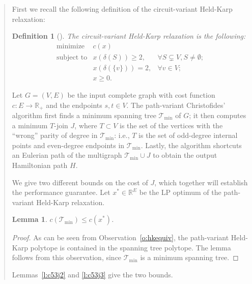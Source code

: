 \documentclass[11pt,letterpaper]{article}
\newtheorem{lemma}{Lemma}
\newtheorem{defn}{Definition}
\begin{document}
\begin{quote}
First we recall the following definition of the circuit-variant Held-Karp relaxation:
\begin{defn}[\cite{HK}]
\label{d:hkcircuit}
The \emph{circuit-variant Held-Karp relaxation} is the following:\begin{equation}\label{e:hkcircuit}
\begin{array}{lll}
\textrm{minimize}&c(x)&\\
\textrm{subject to}&x(\delta(S))\geq 2,&\forall S\subsetneq V, S\neq\emptyset;\\
&x(\delta(\{v\})) = 2,&\forall v\in V;\\
&x\geq 0.&
\end{array}
\end{equation}
\end{defn}

Let $G=(V,E)$ be the input complete graph with cost function $c:E\to\mathbb{R}_+$ and the endpoints $s,t\in V$. The path-variant Christofides' algorithm first finds a minimum spanning tree $\mathscr{T}_{\mathrm{min}}$ of $G$; it then computes a minimum $T$-join $J$, where $T\subset V$ is the set of the vertices with the ``wrong'' parity of degree in $\mathscr{T}_{\mathrm{min}}$: i.e., $T$ is the set of odd-degree internal points and even-degree endpoints in $\mathscr{T}_{\mathrm{min}}$. Lastly, the algorithm shortcuts an Eulerian path of the multigraph $\mathscr{T}_{\mathrm{min}}\cup J$ to obtain the output Hamiltonian path $H$.

We give two different bounds on the cost of $J$, which together will establish the performance guarantee. Let $x^*\in\mathbb{R}^E$ be the LP optimum of the path-variant Held-Karp relaxation.

\begin{lemma}
\label{l:c53j1}
$c(\mathscr{T}_{\mathrm{min}})\leq c(x^*)$.
\end{lemma}
\begin{proof}
As can be seen from Observation~\ref{o:hkequiv}, the path-variant Held-Karp polytope is contained in the spanning tree polytope. The lemma follows from this observation, since $\mathscr{T}_{\mathrm{min}}$ is a minimum spanning tree.
\end{proof}

Lemmas~\ref{l:c53j2} and \ref{l:c53j3} give the two bounds.


\end{quote}
\end{document}
